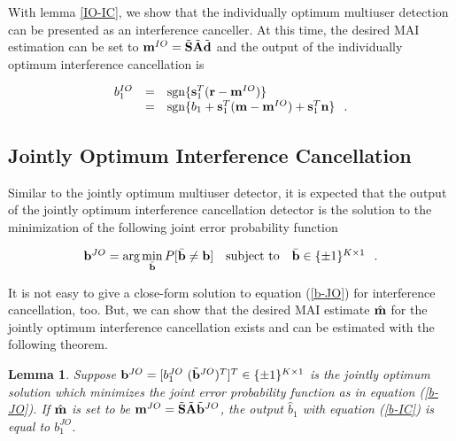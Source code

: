 \documentclass[a4paper,12pt,fleqn]{article}
\newtheorem{lemma}{Lemma}
\newcommand{\br}{{\mathbf r}}
\newcommand{\bA}{{\mathbf A}}
\newcommand{\bb}{{\bf b}}
\newcommand{\bd}{{\bf d}}
\newcommand{\bs}{{\bf s}}
\newcommand{\bn}{{\bf n}}
\newcommand{\bm}{{\bf m}}
\newcommand{\bS}{{\bf S}}
\begin{document}
With lemma \ref{IO-IC}, we show that the individually optimum
multiuser detection can be presented as an interference canceller.
At this time, the desired MAI estimation can be set to
$\bm^{IO}=\tilde{\bS}\tilde{\bA}\tilde{\bd}$ and the output of the
individually optimum interference cancellation is

\begin{equation}
\begin{array}{rcl}
b_1^{IO}&=&\mbox{sgn}\{\bs_1^T(\br-\bm^{IO})\}\\
&=&\mbox{sgn}\{b_1+\bs_1^T(\bm-\bm^{IO})+\bs_1^T\bn\}\hspace{0.1in}.
\end{array}\label{b-IO-IC}
\end{equation}

\subsection{Jointly Optimum Interference Cancellation}

Similar to the jointly optimum multiuser detector, it is expected
that the output of the jointly optimum interference cancellation
detector is the solution to the minimization of the following
joint error probability function

\begin{equation}
\begin{array}{rcl}
\bb^{JO}=\mbox{arg}\min\limits_{\bar{\bb}} P[\bar{\bb}\neq
\bb]&\mbox{subject to}&\bar{\bb}\in\{\pm 1\}^{K\times
1}\hspace{0.1in}.
\end{array}\label{b-JO}
\end{equation}

It is not easy to give a close-form solution to equation
(\ref{b-JO}) for interference cancellation, too. But, we can show
that the desired MAI estimate $\hat{\bm}$ for the jointly optimum
interference cancellation exists and can be estimated with the
following theorem.

\begin{lemma}
Suppose $\bb^{JO}=[b_1^{JO}\ (\tilde{\bb}^{JO})^T]^T \in\{\pm
1\}^{K\times 1}$ is the jointly optimum solution which minimizes
the joint error probability function as in equation (\ref{b-JO}).
If $\hat{\bm}$ is set to be
$\bm^{JO}=\tilde{\bS}\tilde{\bA}\tilde{\bb}^{JO}$, the output
$\hat{b}_1$ with equation (\ref{b-IC}) is equal to $b_1^{JO}$.
\label{Lemma-JO}
\end{lemma}
\end{document}
